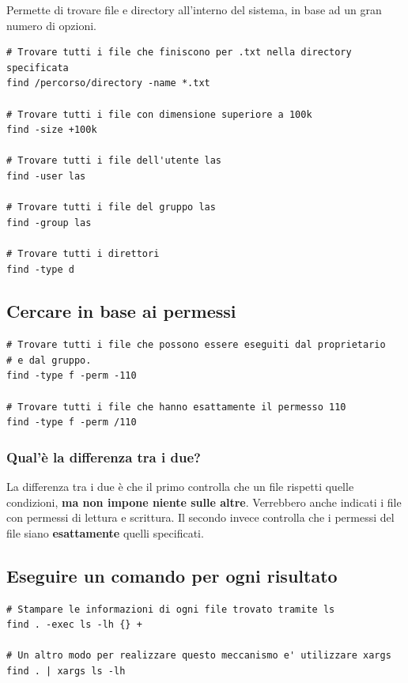\documentclass[a4paper]{report}
\newenvironment{code}{\begin{tcolorbox}[size=small]}{\end{tcolorbox}}
\begin{document}
Permette di trovare file e directory all'interno del sistema, in base ad un gran numero di opzioni.

\begin{code}
\begin{lstlisting}
# Trovare tutti i file che finiscono per .txt nella directory specificata 
find /percorso/directory -name *.txt

# Trovare tutti i file con dimensione superiore a 100k
find -size +100k

# Trovare tutti i file dell'utente las
find -user las

# Trovare tutti i file del gruppo las
find -group las

# Trovare tutti i direttori
find -type d
\end{lstlisting}
\end{code}

\subsection*{Cercare in base ai permessi}

\begin{code}
\begin{lstlisting}
# Trovare tutti i file che possono essere eseguiti dal proprietario
# e dal gruppo.
find -type f -perm -110

# Trovare tutti i file che hanno esattamente il permesso 110
find -type f -perm /110
\end{lstlisting}
\end{code}

\subsubsection*{Qual'è la differenza tra i due?} 

La differenza tra i due è che il primo controlla che un file rispetti quelle condizioni, \textbf{ma non impone niente sulle altre}. Verrebbero anche indicati i file con permessi di lettura e scrittura.
Il secondo invece controlla che i permessi del file siano \textbf{esattamente} quelli specificati.

\subsection*{Eseguire un comando per ogni risultato}

\begin{code}
\begin{lstlisting}
# Stampare le informazioni di ogni file trovato tramite ls
find . -exec ls -lh {} +

# Un altro modo per realizzare questo meccanismo e' utilizzare xargs
find . | xargs ls -lh
\end{lstlisting}
\end{code}
\end{document}
